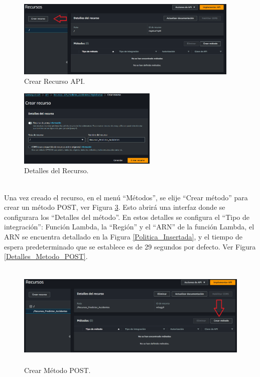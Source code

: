 \documentclass[a4paper,10pt, oneside, titlepage]{article}
\begin{document}
	\begin{figure}[!h]
		\centering
		\includegraphics[width = 1\linewidth, height = 3.7cm]{Crear_Recurso_API.png}
		\caption{Crear Recurso API.}
		\label{Crear_Recurso_API}
	\end{figure}
	\begin{figure}[!h]
		\centering
		\includegraphics[width = 1\linewidth, height = 3.7cm]{Recursos_Predictor_Accidentes.png}
		\caption{Detalles del Recurso.}
		\label{Recursos_Predictor_Accidentes}
	\end{figure} \\
	\indent Una vez creado el recurso, en el menú ``Métodos'', se elije ``Crear método'' para crear un método POST, ver Figura \ref{Crear_Metodo_POST}. Esto abrirá una interfaz donde se configurara los ``Detalles del método''. En estos detalles se configura el ``Tipo de integración'': Función Lambda, la ``Región'' y el ``ARN'' de la función Lambda, el ARN se encuentra detallado en la Figura \ref{Politica_Insertada}, y el tiempo de espera predeterminado que se establece es de 29 segundos por defecto. Ver Figura \ref{Detalles_Metodo_POST}.
	\begin{figure}[!h]
		\centering
		\includegraphics[width = 1\linewidth, height = 5cm]{Crear_Metodo_POST.png}
		\caption{Crear Método POST.}
		\label{Crear_Metodo_POST}
	\end{figure}
\end{document}
